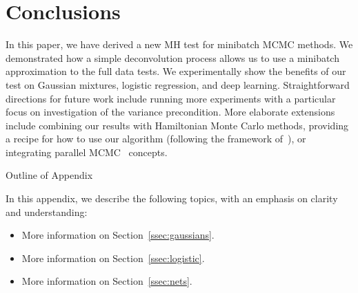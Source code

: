 \documentclass{article}
\begin{document}
\section{Conclusions}\label{sec:conclusion}

In this paper, we have derived a new MH test for minibatch MCMC methods. We demonstrated how a
simple deconvolution process allows us to use a minibatch approximation to the full data tests. We
experimentally show the benefits of our test on Gaussian mixtures, logistic regression, and deep
learning.  Straightforward directions for future work include running more experiments with a
particular focus on investigation of the variance precondition.  More elaborate extensions include
combining our results with Hamiltonian Monte Carlo methods, providing a recipe for how to use our
algorithm (following the framework of~\cite{sgmcmc_2015}), or integrating parallel
MCMC~\cite{conf/uai/AngelinoKWSA14,conf/icml/AhnSW14} concepts.


\small


\normalsize

\clearpage
\appendix

\begin{center}
{\Large Outline of Appendix}
\end{center}

In this appendix, we describe the following topics, with an emphasis on clarity and understanding:

\begin{itemize}[noitemsep]
    \item More information on Section~\ref{ssec:gaussians}.
    \item More information on Section~\ref{ssec:logistic}.
    \item More information on Section~\ref{ssec:nets}.
\end{itemize}



\end{document}
